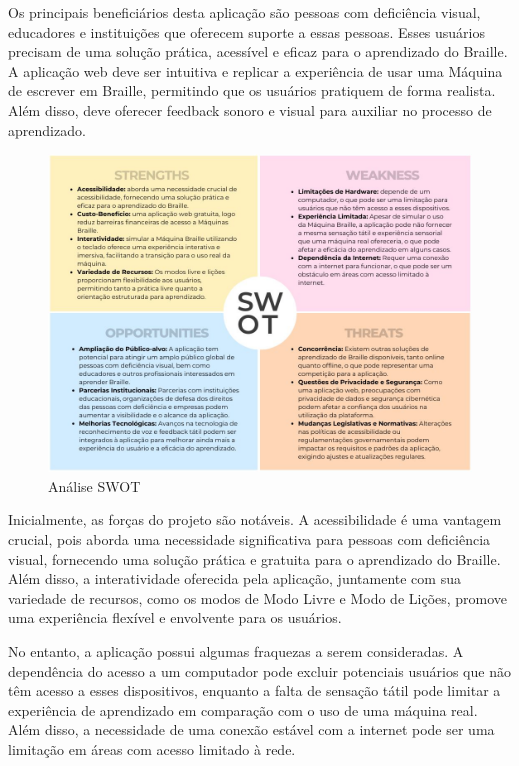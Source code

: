 Os principais beneficiários desta aplicação são pessoas com deficiência visual, educadores e instituições que oferecem suporte a essas pessoas. Esses usuários precisam de uma solução prática, acessível e eficaz para o aprendizado do Braille. A aplicação web deve ser intuitiva e replicar a experiência de usar uma Máquina de escrever em Braille, permitindo que os usuários pratiquem de forma realista. Além disso, deve oferecer feedback sonoro e visual para auxiliar no processo de aprendizado.

\begin{figure}[h]
    \centering
    \includegraphics[scale=0.4]{ch03/assets/analise-swot.jpg}
    \decoRule
    \caption[Análise SWOT]{Análise SWOT}
    \label{fig:ch02-analise-swot}
\end{figure}

Inicialmente, as forças do projeto são notáveis. A acessibilidade é uma vantagem crucial, pois aborda uma necessidade significativa para pessoas com deficiência visual, fornecendo uma solução prática e gratuita para o aprendizado do Braille. Além disso, a interatividade oferecida pela aplicação, juntamente com sua variedade de recursos, como os modos de Modo Livre e Modo de Lições, promove uma experiência flexível e envolvente para os usuários.

No entanto, a aplicação possui algumas fraquezas a serem consideradas. A dependência do acesso a um computador pode excluir potenciais usuários que não têm acesso a esses dispositivos, enquanto a falta de sensação tátil pode limitar a experiência de aprendizado em comparação com o uso de uma máquina real. Além disso, a necessidade de uma conexão estável com a internet pode ser uma limitação em áreas com acesso limitado à rede.

